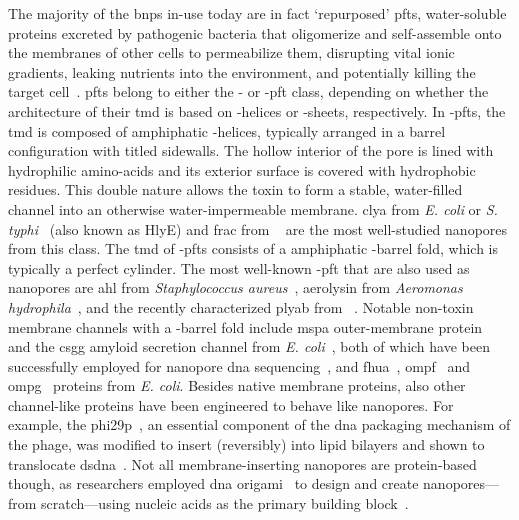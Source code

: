 The majority of the \glspl{bnp} in-use today are in fact `repurposed' \glspl{pft}, water-soluble proteins
excreted by pathogenic bacteria that oligomerize and self-assemble onto the membranes of other cells to
permeabilize them, disrupting vital ionic gradients, leaking nutrients into the environment, and potentially
killing the target cell~\cite{Peraro-2015}. \Glspl{pft} belong to either the \ta- or \tb-\gls{pft} class,
depending on whether the architecture of their \gls{tmd} is based on \ta-helices or \tb-sheets, respectively.
In \ta-\glspl{pft}, the \gls{tmd} is composed of amphiphatic \ta-helices, typically arranged in a barrel
configuration with titled sidewalls. The hollow interior of the pore is lined with hydrophilic amino-acids
and its exterior surface is covered with hydrophobic residues. This double nature allows the toxin to form a
stable, water-filled channel into an otherwise water-impermeable membrane. \Gls{clya} from \textit{E. coli} or
\textit{S. typhi}~\cite{Mueller-2009} (also known as HlyE) and \gls{frac} from ~\cite{Tanaka-2015} are the most well-studied nanopores from this class. The \gls{tmd} of
\tb-\glspl{pft} consists of a amphiphatic \tb-barrel fold, which is typically a perfect cylinder. The most
well-known \tb-\gls{pft} that are also used as nanopores are \gls{ahl} from \textit{Staphylococcus
aureus}~\cite{Song-1996}, aerolysin from \textit{Aeromonas hydrophila}~\cite{Iacovache-2016}, and the recently
characterized \gls{plyab} from \textit{}~\cite{Lukoyanova-Kondos-2015}. Notable non-toxin membrane channels
with a \tb-barrel fold include \gls{mspa} outer-membrane protein~\cite{Faller-2004} and the \gls{csgg} amyloid
secretion channel from \textit{E. coli}~\cite{Goyal-2014}, both of which have been successfully employed for
nanopore \gls{dna} sequencing~\cite{Manrao-2012,Brown-2016}, and \gls{fhua}~\cite{Locher-1998},
\gls{ompf}~\cite{Yamashita-2008} and \gls{ompg}~\cite{Subbarao-2006} proteins from \textit{E. coli}. Besides
native membrane proteins, also other channel-like proteins have been engineered to behave like nanopores. For
example, the \gls{phi29p}~\cite{Xu-2019}, an essential component of the \gls{dna} packaging mechanism of the
 phage, was modified to insert (reversibly) into lipid bilayers and shown to translocate
\gls{dsdna}~\cite{Wendell-2009}. Not all membrane-inserting nanopores are protein-based though, as researchers
employed \gls{dna} origami~\cite{Rothemund-2006} to design and create nanopores---from scratch---using nucleic
acids as the primary building
block~\cite{Bell-2011,Langecker-2012,Burns-2013,Bell-2014,Gopfrich-2016,Gopfrich-2019}.


